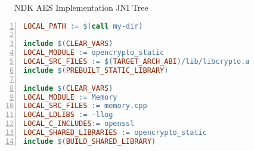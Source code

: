 \begin{appendices}
\begin{figure}[htb]
\caption[NDK AES Implementation JNI Tree]{NDK AES Implementation JNI Tree}
\label{fig:ndk_aes_impl_tree}
\end{figure}
\begin{lstlisting}[language=make, caption=Memory/Android.mk, label=nkd_aes_make, numbers=left]
LOCAL_PATH := $(call my-dir)

include $(CLEAR_VARS)
LOCAL_MODULE := opencrypto_static
LOCAL_SRC_FILES := $(TARGET_ARCH_ABI)/lib/libcrypto.a
include $(PREBUILT_STATIC_LIBRARY)

include $(CLEAR_VARS)
LOCAL_MODULE := Memory
LOCAL_SRC_FILES := memory.cpp
LOCAL_LDLIBS := -llog
LOCAL_C_INCLUDES:= openssl
LOCAL_SHARED_LIBRARIES := opencrypto_static
include $(BUILD_SHARED_LIBRARY)
\end{lstlisting}

\end{appendices}
